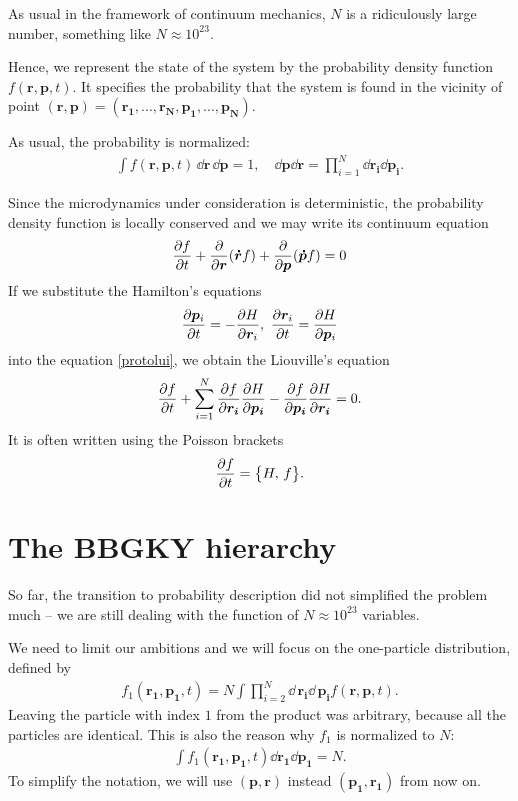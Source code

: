 As usual in the framework of continuum mechanics, $N$ is a ridiculously large number, something like $N \approx 10^{23}$.

Hence, we represent the state of the system by the probability density function $f(\bm{r},\bm{p},t)$. It specifies the probability that the system is found in the vicinity of point $(\bm{r},\bm{p}) = (\bm{r_1},...,\bm{r_N},\bm{p_1},...,\bm{p_N})$.

As usual, the probability is normalized:
\begin{align*}
\int f(\bm{r},\bm{p},t) \, \dd\bm{r} \, \dd\bm{p} = 1, \quad \dd\bm{p} \dd\bm{r} = \prod_{i=1}^N \dd \bm{r_i} \dd \bm{p_i}.
\end{align*}

Since the microdynamics under consideration is deterministic, the probability density function is locally conserved and we may write its continuum equation
\begin{align} \label{protolui}
\frac{\partial f}{\partial t} + \frac{\partial}{\partial \bm{r}} (\bm{\dot{r}} f) + \frac{\partial}{\partial \bm{p}} (\bm{\dot{p}} f) = 0
\end{align}
If we substitute the Hamilton's equations 
\begin{align*}
\frac{\partial \bm{p}_i}{\partial t} = - \frac{\partial H}{\partial \bm{r}_i},~ \frac{\partial \bm{r}_i}{\partial t} = \frac{\partial H}{\partial \bm{p}_i}
\end{align*}
into the equation \ref{protolui}, we obtain the Liouville's equation
\begin{align*}
\frac{\partial f}{\partial t} + \sum_{i=1}^N \frac{\partial f}{\partial \bm{r_i}} \frac{\partial H}{\partial \bm{p_i}} - \frac{\partial f}{\partial \bm{p_i}}\frac{\partial H}{\partial \bm{r_i}} = 0.
\end{align*}
It is often written using the Poisson brackets
\begin{align} \label{lui}
\frac{\partial f}{\partial t} = \big\{ H, \, f \big\}.
\end{align}

\section{The BBGKY hierarchy}
So far, the transition to probability description did not simplified the problem much -- we are still dealing with the function of $N \approx 10^{23}$ variables.

We need to limit our ambitions and we will focus on the one-particle distribution, defined by
\begin{align} \label{1pd}
f_1(\bm{r_1},\bm{p_1},t) = N \int \prod_{i=2}^N \dd \, \bm{r_i} \dd \, \bm{p_i}
 f(\bm{r},\bm{p},t).
\end{align}
Leaving the particle with index $1$ from the product was arbitrary, because all the particles are identical. This is also the reason why $f_1$ is normalized to $N$:
\begin{align*}
\int f_1(\bm{r_1},\bm{p_1},t) \dd \bm{r_1} \dd \bm{p_1} = N.
\end{align*}
To simplify the notation, we will use $(\bm{p},\bm{r})$ instead $(\bm{p_1},\bm{r_1})$ from now on.

